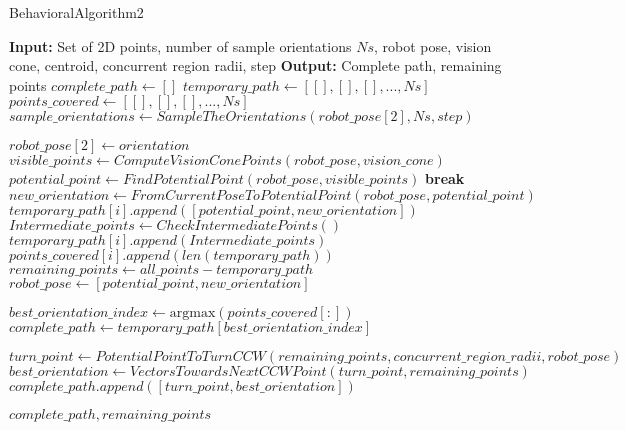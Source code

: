 \begin{algorithm}
    \caption{BehavioralAlgorithm2}
    \begin{algorithmic}[1]
        \Statex \textbf{Input:} Set of 2D points, number of sample orientations $Ns$, robot pose, vision cone, centroid, concurrent region radii, step
        \Statex \textbf{Output:} Complete path, remaining points
        \newline
        \State $complete\_path \gets []$
        \State $temporary\_path \gets [[], [], [], ..., Ns]$
        \State $points\_covered \gets [[], [], [], ..., Ns]$
        \State $sample\_orientations \gets SampleTheOrientations(robot\_pose[2], Ns, step)$
        
            \State $robot\_pose[2] \gets orientation$
                \State $visible\_points \gets ComputeVisionConePoints(robot\_pose, vision\_cone)$
                \State $potential\_point \gets FindPotentialPoint(robot\_pose, visible\_points)$
                    \State \textbf{break}
                \EndIf
                \State $new\_orientation \gets FromCurrentPoseToPotentialPoint(robot\_pose, potential\_point)$
                \State $temporary\_path[i].append([potential\_point, new\_orientation])$
                \State $Intermediate\_points \gets CheckIntermediatePoints()$
                \State $temporary\_path[i].append(Intermediate\_points)$
                \State $points\_covered[i].append(len(temporary\_path))$
                \State $remaining\_points \gets all\_points - temporary\_path$
                \State $robot\_pose \gets [potential\_point, new\_orientation]$
            \EndWhile
        \EndFor
        
        \State $best\_orientation\_index \gets \text{argmax}(points\_covered[:])$
        \State $complete\_path \gets temporary\_path[best\_orientation\_index]$
        
        \State $turn\_point \gets PotentialPointToTurnCCW(remaining\_points, concurrent\_region\_radii, robot\_pose)$
        \State $best\_orientation \gets VectorsTowardsNextCCWPoint(turn\_point, remaining\_points)$
        \State $complete\_path.append([turn\_point, best\_orientation])$
        
        \State \Return $complete\_path, remaining\_points$
    \end{algorithmic}
\end{algorithm}

